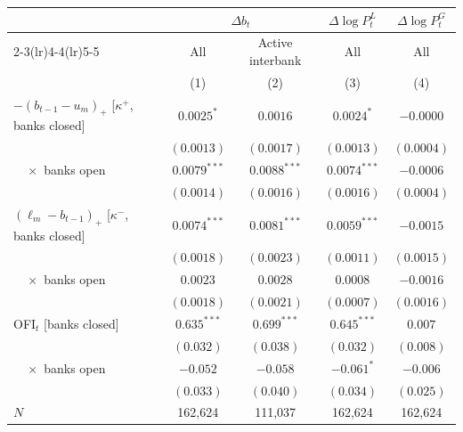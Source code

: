 \begin{tabular}{lcccc}
\toprule
 & \multicolumn{2}{c}{$\Delta b_t$} & $\Delta\log P^L_t$ & $\Delta\log P^G_t$ \\
\cmidrule(lr){2-3}\cmidrule(lr){4-4}\cmidrule(lr){5-5}
 & All & Active interbank & All & All \\
 & (1) & (2) & (3) & (4) \\
\midrule
$-(b_{t-1}-u_m)_+$ [$\kappa^+$, banks closed] & $0.0025^{*}$ & $0.0016$ & $0.0024^{*}$ & $-0.0000$ \\
 & $(0.0013)$ & $(0.0017)$ & $(0.0013)$ & $(0.0004)$ \\
$\quad\times$ banks open & $0.0079^{***}$ & $0.0088^{***}$ & $0.0074^{***}$ & $-0.0006$ \\
 & $(0.0014)$ & $(0.0016)$ & $(0.0016)$ & $(0.0004)$ \\
$(\ell_m-b_{t-1})_+$ [$\kappa^-$, banks closed] & $0.0074^{***}$ & $0.0081^{***}$ & $0.0059^{***}$ & $-0.0015$ \\
 & $(0.0018)$ & $(0.0023)$ & $(0.0011)$ & $(0.0015)$ \\
$\quad\times$ banks open & $0.0023$ & $0.0028$ & $0.0008$ & $-0.0016$ \\
 & $(0.0018)$ & $(0.0021)$ & $(0.0007)$ & $(0.0016)$ \\
OFI$_t$ [banks closed] & $0.635^{***}$ & $0.699^{***}$ & $0.645^{***}$ & $0.007$ \\
 & $(0.032)$ & $(0.038)$ & $(0.032)$ & $(0.008)$ \\
$\quad\times$ banks open & $-0.052$ & $-0.058$ & $-0.061^{*}$ & $-0.006$ \\
 & $(0.033)$ & $(0.040)$ & $(0.034)$ & $(0.025)$ \\
\midrule
$N$ & 162,624 & 111,037 & 162,624 & 162,624 \\
\bottomrule
\end{tabular}
